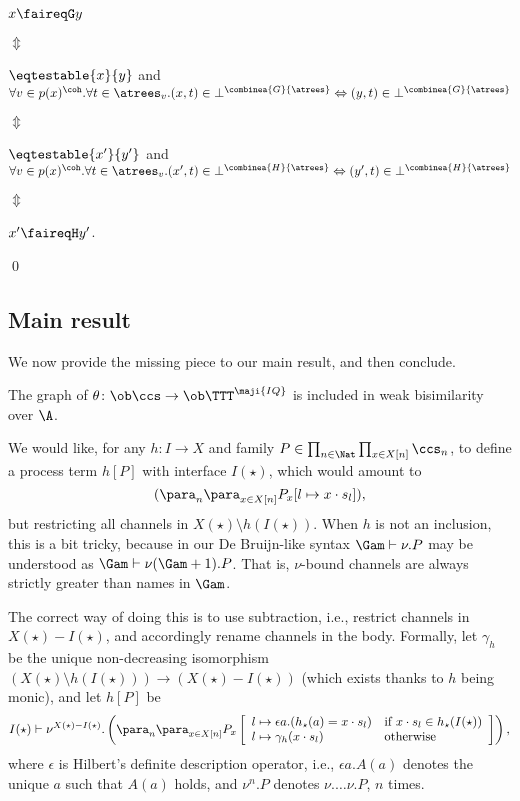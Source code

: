\documentclass{LMCS}
\renewcommand{\QFI}{\maji{IQ}}
\renewcommand{\LLL}{\QFI}
\renewcommand{\TTTL}{\TTT^{\LLL}}
\theoremstyle{plain}\newtheorem{satz}[thm]{Satz}
\begin{document}
  \begin{minipage}[b]{.8\linewidth}
    \centering
  $x \faireqG y$

$\Updownarrow$

$\eqtestable{x}{y}$ and $\forall v \in p(x)^\coh.\forall t \in \atrees_v.
(x,t) \in \bot^{\combinea{G}{\atrees}} 
\Leftrightarrow 
(y,t) \in \bot^{\combinea{G}{\atrees}}$

$\Updownarrow$

$\eqtestable{x'}{y'}$ and $\forall v \in p(x)^\coh.\forall t \in \atrees_v.
(x',t) \in \bot^{\combinea{H}{\atrees}} 
\Leftrightarrow 
(y',t) \in \bot^{\combinea{H}{\atrees}}$

$\Updownarrow$

  $x' \faireqH y'$.
\end{minipage}
\qed

\subsection{Main result}\label{subsec:horror}
We now provide the missing piece to our main result, and then conclude. 

\begin{lem}\label{lem:ccsTTTL}
  The graph of $\theta \colon \ob\ccs \to \ob\TTTL$ is included in weak
  bisimilarity over $\A$.
\end{lem}
\proof We would like, for any $h \colon I \to X$ and family $P
\in \prod_{n \in \Nat} \prod_{x \in X[n]} \ccs_n$, to define 
a process term $h[P]$ with interface $I(\star)$,
which would amount to 
$$(\para_{n} \para_{x \in X[n]} P_x
[l \mapsto x \cdot s_l]),$$ 
but restricting all channels in $X (\star) \setminus h(I (\star))$. 
When $h$ is not an inclusion, this is a bit tricky, because in our De Bruijn-like syntax
$\Gam \vdash \nu.P$ may be understood as $\Gam \vdash \nu (\Gam+1).P$. That is,
$\nu$-bound channels are always strictly greater than names in $\Gam$.

The correct way of doing this is to use subtraction, i.e.,
restrict channels in $X(\star) - I(\star)$, and accordingly rename channels in the body.
Formally, let $\gamma_h$ be the unique non-decreasing
isomorphism $(X (\star) \setminus h(I (\star))) \to (X (\star) -
I(\star))$ (which exists thanks to $h$ being monic), and let
$h[P]$ be
$$I(\star) \vdash \nu^{X (\star) - I (\star)}. \left (\para_{n} \para_{x \in X[n]} P_x
\left [
  \begin{array}[c]{ll}
    l \mapsto \epsilon a.(h_\star(a) = x \cdot s_l) & \mbox{if $x \cdot s_l \in h_\star(I(\star))$} \\
    l \mapsto \gamma_h(x \cdot s_l) & \mbox{otherwise} 
  \end{array}
\right ] \right ),$$ where $\epsilon$ is Hilbert's definite
description operator, i.e., $\epsilon a.A(a)$ denotes the unique $a$
such that $A(a)$ holds, and $\nu^n.P$ denotes $\nu. \ldots \nu.P$, $n$
times. 
\end{document}
